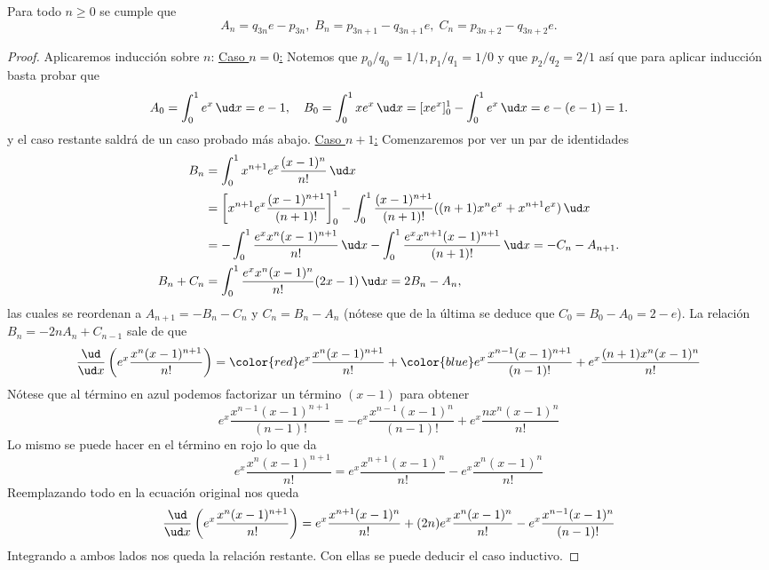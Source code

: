 \documentclass[teoria-numeros.tex]{subfiles}
\begin{document}
\begin{lem}
	Para todo $n\ge 0$ se cumple que
	$$ A_n = q_{3n}e - p_{3n}, \; B_n = p_{3n+1} - q_{3n+1}e, \; C_n = p_{3n+2} - q_{3n+2}e. $$
\end{lem}
\begin{proof}
	Aplicaremos inducción sobre $n$:
	\underline{Caso $n = 0$:}
	Notemos que $p_0/q_0 = 1/1, p_1/q_1 = 1/0$ y que $p_2/q_2 = 2/1$ así que para aplicar inducción basta probar que
	$$ A_0 = \int_0^1 e^x \, \ud x = e - 1, \quad B_0 = \int_0^1 xe^x \, \ud x = [ xe^x ]_0^1 - \int_0^1 e^x \, \ud x = e - (e - 1) = 1. $$
	y el caso restante saldrá de un caso probado más abajo.
	\underline{Caso $n+1$:} Comenzaremos por ver un par de identidades
	\begin{align*}
		B_n &= \int_0^1 x^{n+1}e^x \frac{(x-1)^n}{n!} \, \ud x \\
		    &= \left[ x^{n+1}e^x \frac{(x-1)^{n+1}}{(n+1)!} \right]_0^1 - \int_0^1 \frac{(x-1)^{n+1}}{(n+1)!} ( (n+1)x^ne^x + x^{n+1}e^x ) \, \ud x \\
		    &= -\int_0^1 \frac{e^xx^n(x-1)^{n+1}}{n!} \, \ud x - \int_0^1 \frac{e^x x^{n+1}(x-1)^{n+1}}{(n+1)!} \, \ud x = -C_n - A_{n+1}. \\
		B_n + C_n &= \int_0^1 \frac{e^x x^n (x-1)^n}{n!}(2x - 1) \, \ud x = 2B_n - A_n,
	\end{align*}
	las cuales se reordenan a $A_{n+1} = -B_n - C_n$ y $C_n = B_n - A_n$
	(nótese que de la última se deduce que $C_0 = B_0 - A_0 = 2 - e$).
	La relación $B_n = -2nA_n + C_{n-1}$ sale de que
	$$ \frac{\ud}{\ud x}\left( e^x\frac{x^n(x - 1)^{n+1}}{n!} \right)
	= {\color{red} e^x \frac{x^n(x - 1)^{n+1}}{n!} } + {\color{blue} e^x \frac{x^{n-1}(x - 1)^{n+1}}{(n-1)!} } + e^x \frac{(n+1)x^n(x - 1)^n}{n!} $$
	Nótese que al término en azul podemos factorizar un término $(x - 1)$ para obtener
	$$ e^x \frac{x^{n-1}(x - 1)^{n+1}}{(n-1)!} = -e^x\frac{x^{n-1}(x - 1)^n}{(n-1)!} + e^x \frac{n x^n (x - 1)^n}{n!} $$
	Lo mismo se puede hacer en el término en rojo lo que da
	$$ e^x \frac{x^n(x - 1)^{n+1}}{n!} = e^x \frac{x^{n+1}(x-1)^n}{n!} - e^x\frac{x^n(x-1)^n}{n!} $$
	Reemplazando todo en la ecuación original nos queda
	$$ \frac{\ud}{\ud x}\left( e^x\frac{x^n(x - 1)^{n+1}}{n!} \right)
	= e^x \frac{x^{n+1}(x-1)^n}{n!} + (2n) e^x \frac{x^n(x - 1)^n}{n!} -e^x\frac{x^{n-1}(x - 1)^n}{(n-1)!} $$
	Integrando a ambos lados nos queda la relación restante.
	Con ellas se puede deducir el caso inductivo.
\end{proof}
\end{document}

